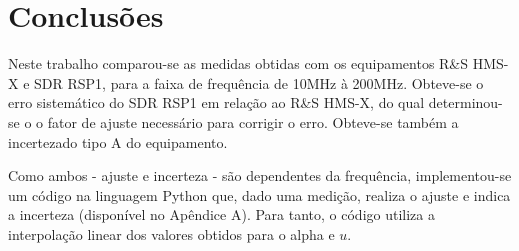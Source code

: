 \chapter{Conclusões}

Neste trabalho comparou-se as medidas obtidas com os equipamentos R\&S HMS-X e SDR RSP1, para a faixa de frequência de 10MHz à 200MHz.
Obteve-se o erro sistemático do SDR RSP1 em relação ao R\&S HMS-X, do qual determinou-se o o fator de ajuste necessário para corrigir o erro. Obteve-se também a incertezado tipo A do equipamento. 


Como ambos - ajuste e incerteza - são dependentes da frequência, implementou-se um código na linguagem Python que, dado uma medição, realiza o ajuste e indica a incerteza (disponível no Apêndice A). Para tanto, o código utiliza a interpolação linear dos valores obtidos para o alpha e $u$. 